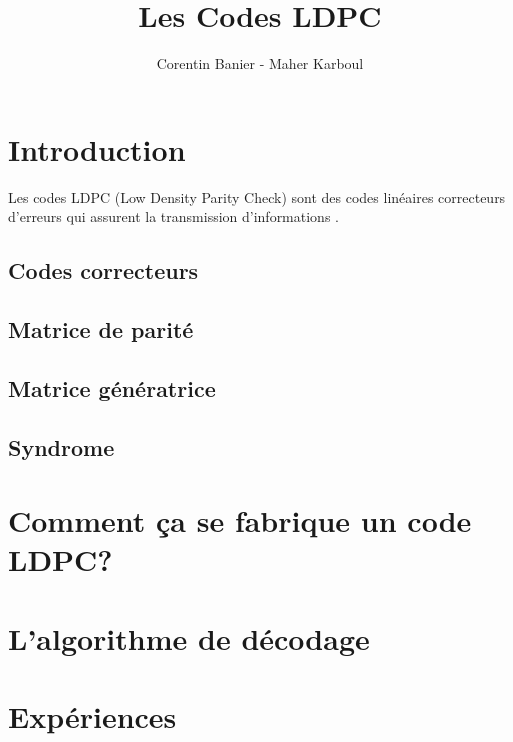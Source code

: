 \documentclass{article}
\title{Les Codes LDPC }
\author{Corentin Banier - Maher Karboul}
\date{}
\begin{document}
\maketitle
\tableofcontents

\section{Introduction}
Les codes LDPC (Low Density Parity Check) sont des codes linéaires correcteurs d'erreurs qui assurent la transmission d'informations .

\subsection{Codes correcteurs}
\subsection{Matrice de parité}
\subsection{Matrice génératrice}
\subsection{Syndrome}

\section{Comment ça se fabrique un code LDPC?}
\section{L'algorithme de décodage}
\section{Expériences}
\end{document}
